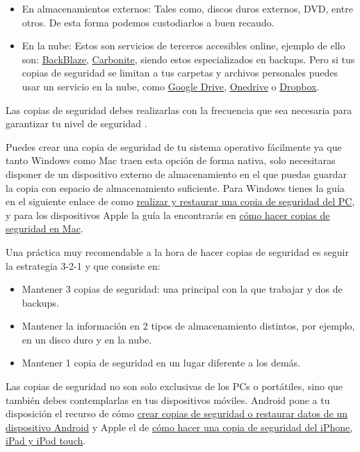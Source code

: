 \documentclass[
  a4paper,
  openany]{book}
\begin{document}
\begin{itemize}
\item
  En almacenamientos externos: Tales como, discos duros externos, DVD, entre otros. De esta forma podemos custodiarlos a buen recaudo.
\item
  En la nube: Estos son servicios de terceros accesibles online, ejemplo de ello son: \href{https://www.backblaze.com/home-1.html}{BackBlaze}, \href{https://www.carbonite.com/}{Carbonite}, siendo estos especializados en backups. Pero si tus copias de seguridad se limitan a tus carpetas y archivos personales puedes usar un servicio en la nube, como \href{https://www.google.com/intl/en_in/drive/}{Google Drive}, \href{https://www.microsoft.com/en-us/microsoft-365/onedrive/online-cloud-storage}{Onedrive} o \href{https://www.dropbox.com/}{Dropbox}.
\end{itemize}

Las copias de seguridad debes realizarlas con la frecuencia que sea necesaria para garantizar tu nivel de seguridad \citep{tipos-copia-seguridad}.

Puedes crear una copia de seguridad de tu sistema operativo fácilmente ya que tanto Windows como Mac traen esta opción de forma nativa, solo necesitaras disponer de un dispositivo externo de almacenamiento en el que puedas guardar la copia con espacio de almacenamiento suficiente. Para Windows tienes la guía en el siguiente enlace de como \href{https://support.microsoft.com/es-es/windows/realizar-y-restaurar-una-copia-de-seguridad-del-pc-ac359b36-7015-4694-de9a-c5eac1ce9d9c}{realizar y restaurar una copia de seguridad del PC}, y para los dispositivos Apple la guía la encontrarás en \href{https://support.apple.com/es-es/mac-backup}{cómo hacer copias de seguridad en Mac}.

Una práctica muy recomendable a la hora de hacer copias de seguridad es seguir la estrategia 3-2-1 \citep{INCI-copia-3-2-1} y que consiste en:

\begin{itemize}
\item
  Mantener 3 copias de seguridad: una principal con la que trabajar y dos de backups.
\item
  Mantener la información en 2 tipos de almacenamiento distintos, por ejemplo, en un disco duro y en la nube.
\item
  Mantener 1 copia de seguridad en un lugar diferente a los demás.
\end{itemize}

Las copias de seguridad no son solo exclusivas de los PCs o portátiles, sino que también debes contemplarlas en tus dispositivos móviles. Android pone a tu disposición el recurso de cómo \href{https://support.google.com/android/answer/2819582?hl=es\&visit_id=637514255756661953-3969236140\&rd=1}{crear copias de seguridad o restaurar datos de un dispositivo Android} y Apple el de \href{https://support.apple.com/es-es/HT203977}{cómo hacer una copia de seguridad del iPhone, iPad y iPod touch}.
\end{document}
